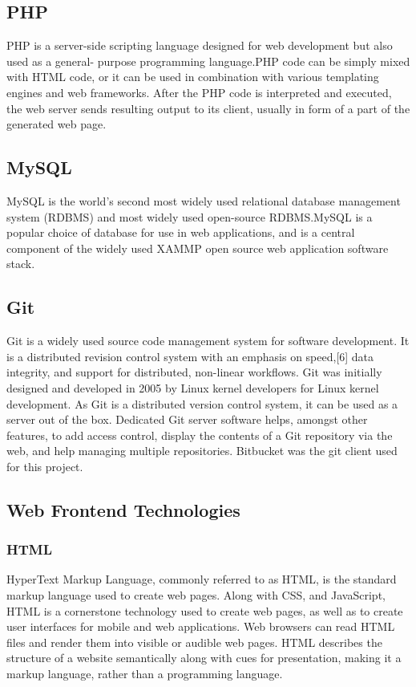 \documentclass[11pt]{report}
\begin{document}
\subsection{PHP}
PHP is a server-side scripting language designed for web development but also used as a general-
purpose programming language.PHP code can be simply mixed with HTML code, or it can be
used in combination with various templating engines and web frameworks. After the PHP code is
interpreted and executed, the web server sends resulting output to its client, usually in form of a
part of the generated web page.
\subsection{MySQL}
MySQL is the world’s second most widely used relational database management system (RDBMS)
and most widely used open-source RDBMS.MySQL is a popular choice of database for use in web
applications, and is a central component of the widely used XAMMP open source web application
software stack.
\subsection{Git}
Git is a widely used source code management system for software development. It is a distributed revision control system with an emphasis on speed,[6] data integrity, and support for distributed, non-linear workflows. Git was initially designed and developed in 2005 by Linux kernel developers for Linux kernel development. As Git is a distributed version control system, it can be used as a server out of the box. Dedicated Git server software helps, amongst other features, to add access control, display the contents of a Git repository via the web, and help managing multiple repositories. Bitbucket was the git client used for this project.
\subsection{Web Frontend Technologies}
\subsubsection{HTML}
HyperText Markup Language, commonly referred to as HTML, is the standard markup language used to create web pages. Along with CSS, and JavaScript, HTML is a cornerstone technology used to create web pages, as well as to create user interfaces for mobile and web applications. Web browsers can read HTML files and render them into visible or audible web pages. HTML describes the structure of a website semantically along with cues for presentation, making it a markup language, rather than a programming language.
\end{document}
